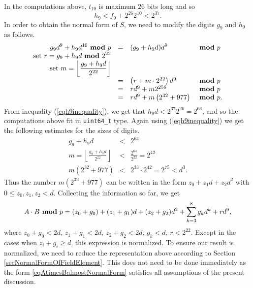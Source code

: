 \documentclass{article}
\renewcommand{\mod}{{~\bf mod~}}
\begin{document}
In the computations above, $t_{19}$ is maximum $26$ bits long and so
\begin{equation}\label{eqh9inequality}
h_9 < f_9 + 2^{26}2^{10} < 2^{37}.
\end{equation}
In order to obtain the normal form of $S$, we need to modify the digits $g_9$ and $h_9$ as follows.
\[
\begin{array}{rcll}
\displaystyle g_9 d^9 + h_9 d^{10} \mod p &=&\displaystyle  (g_9+h_9 d )d^9 &\mod p \\
\displaystyle \text{set }r =g_9 + h_9 d \mod 2^{22}\\
\displaystyle \text{set }m = \left\lfloor \frac{g_9 + h_9 d }{2^{22}} \right\rfloor\\
&=& \left( r + m \cdot 2^{22} \right) d^9  &\mod p\\
&=& r d^9 + m 2^{256} &\mod p\\
&=& r d^9 + m\left(2^{32}+977\right) &\mod p.\\
\end{array}
\]
From inequality (\ref{eqh9inequality}), we get that $h_9 d < 2^{37} 2^{26} = 2^{63}$, and so the computations above fit in \verb|uint64_t| type. Again using (\ref{eqh9inequality}) we get the following estimates for the sizes of digits.
\[
\begin{array}{rcl}

\displaystyle g_9+ h_9 d &<& \displaystyle 2^{64}\\
\displaystyle m=\left\lfloor \frac{g_9 + h_9 d }{2^{22}} \right\rfloor&<& \displaystyle \frac{2^{64}}{2^{22}} = 2^{42}\\
m\left(2^{32}+977\right) &<& 2^{33}\cdot 2^{42} = 2^{75} < d^3.
\end{array}
\]
Thus the number $m\left(2^{32}+977\right)$ can be written in the form $z_0 + z_1 d + z_2 d^2 $ with $0\leq z_0, z_1, z_2 < d$. Collecting the information so far, we get 
\begin{equation}\label{eqAtimesBalmostNormalForm}
A\cdot B \mod p = (z_0 + g_0) + (z_1 + g_1)d + (z_2+g_2)d^2 + \sum _{k=3}^{8} g_k d^k + r d^9,
\end{equation}
where $z_0+g_0 < 2d$, $z_1+g_1 <2d$, $z_2+g_2<2d$, $g_k< d$, $r < 2^{22}$. Except in the cases when $z_i+g_i\geq d$, this expression is normalized. To ensure our result is normalized, we need to reduce the representation above according to Section \ref{secNormalFormOfFieldElement}. This does not need to be done immediately as the form \eqref{eqAtimesBalmostNormalForm} satisfies all assumptions of the present discussion. 







\end{document}
